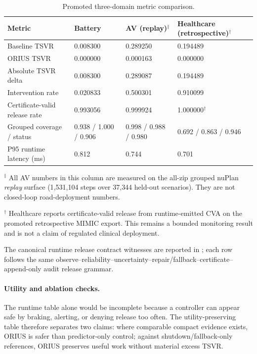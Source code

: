 \begin{table}[t]
\caption{Promoted three-domain metric comparison.}
\label{tab:cross_domain_metrics_three}
\centering\footnotesize
\begin{tabularx}{\textwidth}{p{} p{} p{} X}
\toprule
\textbf{Metric} & \textbf{Battery} & \textbf{AV (replay)}$^\ddagger$ & \textbf{Healthcare (retrospective)}$^\dagger$ \\
\midrule
Baseline TSVR           & 0.008300 & 0.289250 & 0.194489 \\
ORIUS TSVR              & 0.000000 & 0.000163 & 0.000000 \\
Absolute TSVR delta     & 0.008300 & 0.289087 & 0.194489 \\
Intervention rate       & 0.020833 & 0.500301 & 0.910099 \\
Certificate-valid release rate & 0.993056 & 0.999924 & 1.000000$^\dagger$ \\
Grouped coverage / status & 0.938 / 1.000 / 0.906 & 0.998 / 0.988 / 0.980 & 0.692 / 0.863 / 0.946 \\
P95 runtime latency (ms) & 0.812 & 0.744 & 0.701 \\
\bottomrule
\end{tabularx}
\end{table}

{\footnotesize $^\ddagger$ All AV numbers in this column are measured on the
all-zip grouped nuPlan \emph{replay} surface (1{,}531{,}104 steps over 37{,}344
held-out scenarios).  They are not closed-loop road-deployment numbers.}

{\footnotesize $^\dagger$ Healthcare reports certificate-valid release from
runtime-emitted CVA on the promoted retrospective MIMIC export.  This remains a
bounded monitoring result and is not a claim of regulated clinical deployment.}

The canonical runtime release contract witnesses are reported in
; each row follows the same
observe--reliability--uncertainty--repair/fallback--certificate--append-only audit
release grammar.


\paragraph{Utility and ablation checks.}
The runtime table alone would be incomplete because a controller can appear safe
by braking, alerting, or denying release too often.  The utility-preserving table
therefore separates two claims: where comparable compact evidence exists, ORIUS
is safer than predictor-only control; against shutdown/fallback-only references,
ORIUS preserves useful work without material excess TSVR.

